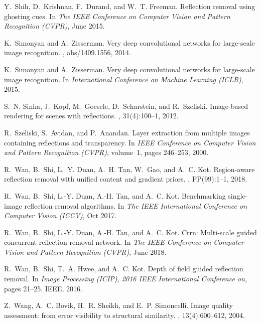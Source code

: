 \documentclass[10pt,twocolumn,letterpaper]{article}
\begin{document}
{\begin{thebibliography}{10}
Y.~Shih, D.~Krishnan, F.~Durand, and W.~T. Freeman.
\newblock Reflection removal using ghosting cues.
\newblock In {\em The IEEE Conference on Computer Vision and Pattern
  Recognition (CVPR)}, June 2015.

K.~Simonyan and A.~Zisserman.
\newblock Very deep convolutional networks for large-scale image recognition.
, abs/1409.1556, 2014.

K.~Simonyan and A.~Zisserman.
\newblock Very deep convolutional networks for large-scale image recognition.
\newblock In {\em International Conference on Machine Learning (ICLR)}, 2015.

S.~N. Sinha, J.~Kopf, M.~Goesele, D.~Scharstein, and R.~Szeliski.
\newblock Image-based rendering for scenes with reflections.
, 31(4):100--1, 2012.

R.~Szeliski, S.~Avidan, and P.~Anandan.
\newblock Layer extraction from multiple images containing reflections and
  transparency.
\newblock In {\em IEEE Conference on Computer Vision and Pattern Recognition
  (CVPR)}, volume~1, pages 246--253, 2000.

R.~Wan, B.~Shi, L.~Y. Duan, A.~H. Tan, W.~Gao, and A.~C. Kot.
\newblock Region-aware reflection removal with unified content and gradient
  priors.
, PP(99):1--1, 2018.

R.~Wan, B.~Shi, L.-Y. Duan, A.-H. Tan, and A.~C. Kot.
\newblock Benchmarking single-image reflection removal algorithms.
\newblock In {\em The IEEE International Conference on Computer Vision (ICCV)},
  Oct 2017.

R.~Wan, B.~Shi, L.-Y. Duan, A.-H. Tan, and A.~C. Kot.
\newblock Crrn: Multi-scale guided concurrent reflection removal network.
\newblock In {\em The IEEE Conference on Computer Vision and Pattern
  Recognition (CVPR)}, June 2018.

R.~Wan, B.~Shi, T.~A. Hwee, and A.~C. Kot.
\newblock Depth of field guided reflection removal.
\newblock In {\em Image Processing (ICIP), 2016 IEEE International Conference
  on}, pages 21--25. IEEE, 2016.

Z.~Wang, A.~C. Bovik, H.~R. Sheikh, and E.~P. Simoncelli.
\newblock Image quality assessment: from error visibility to structural
  similarity.
, 13(4):600--612, 2004.


\end{thebibliography}}
\end{document}
